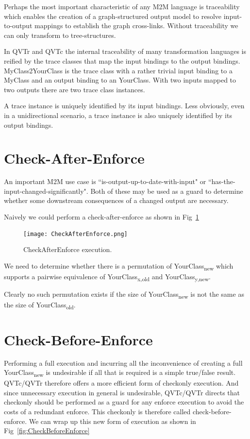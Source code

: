 \documentclass{llncs}
\begin{document}
Perhaps the most important characteristic of any M2M language is traceability which enables the creation of a graph-structured output model to resolve input-to-output mappings to establish the graph cross-links. Without traceability we can only transform to tree-structures.

In QVTr and QVTc the internal traceability of many transformation languages is reified by the trace classes that map the input bindings to the output bindings. MyClass2YourClass is the trace class with a rather trivial input binding to a MyClass and an output binding to an YourClass. With two inputs mapped to two outputs there are two trace class instances.

A trace instance is uniquely identified by its input bindings. Less obviously, even in a unidirectional scenario, a trace instance is also uniquely identified by its output bindings.

\section{Check-After-Enforce}

An important M2M use case is ``is-output-up-to-date-with-input" or ``has-the-input-changed-significantly". Both of these may be used as a guard to determine whether some downstream consequences of a changed output are necessary. 

Naively we could perform a check-after-enforce as shown in Fig~\ref{fig:CheckAfterEnforce}

\begin{figure}[h]
	\centering
	\texttt{[image: CheckAfterEnforce.png]}
	\caption{CheckAfterEnforce execution.}
	\label{fig:CheckAfterEnforce}
\end{figure}

We need to determine whether there is a permutation of YourClass\textsubscript{new} which supports a pairwise equivalence of YourClass\textsubscript{x,old} and YourClass\textsubscript{y,new}.

Clearly no such permutation exists if the size of YourClass\textsubscript{new} is not the same as the size of YourClass\textsubscript{old}.

\section{Check-Before-Enforce}

Performing a full execution and incurring all the inconvenience of creating a full YourClass\textsubscript{new} is undesirable if all that is required is a simple true/false result. QVTc/QVTr therefore offers a more efficient form of checkonly execution. And since unnecessary execution in general is undesirable, QVTc/QVTr directs that checkonly should be performed as a guard for any enforce execution to avoid the costs of a redundant enforce. This checkonly is therefore called check-before-enforce. We can wrap up this new form of execution as shown in Fig~\ref{fig:CheckBeforeEnforce}
\end{document}
